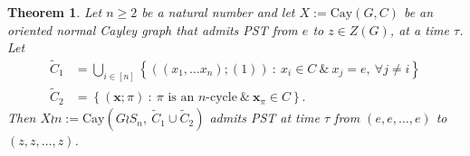 \documentclass{amsart}
\theoremstyle{plain}
\newtheorem{theorem}{Theorem}[section]
\theoremstyle{remark}\newtheorem{con}[theorem]{Construction}
\theoremstyle{remark} \newtheorem*{remark}{Remark}
\theoremstyle{remark} \newtheorem{example}{Example}
\newcommand{\mrm}{\mathrm}
\newcommand{\mbf}{\mathbf}
\begin{document}
\begin{theorem}\label{thm:wreath}
Let $n\geq 2$ be a natural number and let $X:=\mrm{Cay}(G,C)$ be an oriented normal Cayley graph that admits PST from $e$ to $z\in Z(G)$, at a time $\tau$. 
Let 
\begin{subequations}\label{eq:wreathconnex}
\begin{align}
\tilde{C}_{1} &=  \bigcup\limits_{i \in [n]} \left\{((x_{1}, \ldots x_{n}); (1))\ :\ x_{i}\in C\ \& \ x_{j}=e,\ \forall j\neq i\right\}\\
\tilde{C}_{2} &= \left\{(\mbf{x};\pi)\ :\ \text{$\pi$ is an $n$-cycle}\ \&\ \mbf{x}_{\pi}\in C\right\}.
\end{align} 
\end{subequations}
Then $X \wr n := \mrm{Cay}(G\wr S_{n},\ \tilde{C}_{1}\cup \tilde{C}_{2})$ admits PST at time $\tau$ from $(e,e,\ldots, e)$ to $(z,z,\ldots, z)$.
\end{theorem}
\end{document}
